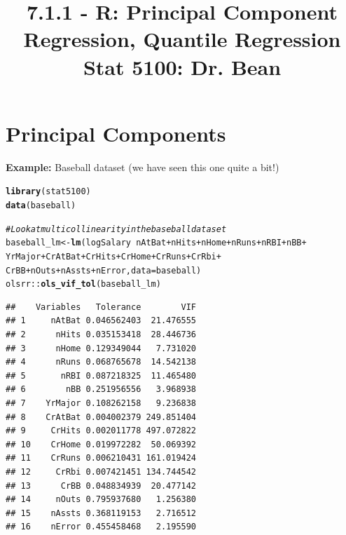 \documentclass{article}\usepackage[]{graphicx}\usepackage[]{color}
\makeatletter
\newcommand{\hlcom}[1]{\textcolor[rgb]{0.678,0.584,0.686}{\textit{#1}}}%
\newcommand{\hlopt}[1]{\textcolor[rgb]{0,0,0}{#1}}%
\newcommand{\hlstd}[1]{\textcolor[rgb]{0.345,0.345,0.345}{#1}}%
\newcommand{\hlkwb}[1]{\textcolor[rgb]{0.69,0.353,0.396}{#1}}%
\newcommand{\hlkwc}[1]{\textcolor[rgb]{0.333,0.667,0.333}{#1}}%
\newcommand{\hlkwd}[1]{\textcolor[rgb]{0.737,0.353,0.396}{\textbf{#1}}}%
\newenvironment{kframe}{%
 \def\at@end@of@kframe{}%
 \ifinner\ifhmode%
  \def\at@end@of@kframe{\end{minipage}}%
  \begin{minipage}{\columnwidth}%
 \fi\fi%
 \def\FrameCommand##1{\hskip\@totalleftmargin \hskip-\fboxsep
 \colorbox{shadecolor}{##1}\hskip-\fboxsep
     \hskip-\linewidth \hskip-\@totalleftmargin \hskip\columnwidth}%
 \MakeFramed {\advance\hsize-\width
   \@totalleftmargin\z@ \linewidth\hsize
   \@setminipage}}%
 {\par\unskip\endMakeFramed%
 \at@end@of@kframe}
\newenvironment{knitrout}{}{} %
\makeatother
\begin{document}
\title{%
  7.1.1 - R: Principal Component Regression, Quantile Regression \\
  \smallskip
  \large Stat 5100: Dr. Bean
}
\date{}

\maketitle

\section*{Principal Components}

\textbf{Example:} Baseball dataset (we have seen this one quite a bit!)

\begin{knitrout}
\color{fgcolor}\begin{kframe}
\begin{alltt}
\hlkwd{library}\hlstd{(stat5100)}
\hlkwd{data}\hlstd{(baseball)}

\hlcom{# Look at multicollinearity in the baseball dataset}
\hlstd{baseball_lm} \hlkwb{<-} \hlkwd{lm}\hlstd{(logSalary} \hlopt{~} \hlstd{nAtBat} \hlopt{+} \hlstd{nHits} \hlopt{+} \hlstd{nHome} \hlopt{+} \hlstd{nRuns} \hlopt{+} \hlstd{nRBI} \hlopt{+} \hlstd{nBB} \hlopt{+}
                    \hlstd{YrMajor} \hlopt{+} \hlstd{CrAtBat} \hlopt{+} \hlstd{CrHits} \hlopt{+} \hlstd{CrHome} \hlopt{+} \hlstd{CrRuns} \hlopt{+} \hlstd{CrRbi} \hlopt{+}
                    \hlstd{CrBB} \hlopt{+} \hlstd{nOuts} \hlopt{+} \hlstd{nAssts} \hlopt{+} \hlstd{nError,} \hlkwc{data} \hlstd{= baseball)}
\hlstd{olsrr}\hlopt{::}\hlkwd{ols_vif_tol}\hlstd{(baseball_lm)}
\end{alltt}
\begin{verbatim}
##    Variables   Tolerance        VIF
## 1     nAtBat 0.046562403  21.476555
## 2      nHits 0.035153418  28.446736
## 3      nHome 0.129349044   7.731020
## 4      nRuns 0.068765678  14.542138
## 5       nRBI 0.087218325  11.465480
## 6        nBB 0.251956556   3.968938
## 7    YrMajor 0.108262158   9.236838
## 8    CrAtBat 0.004002379 249.851404
## 9     CrHits 0.002011778 497.072822
## 10    CrHome 0.019972282  50.069392
## 11    CrRuns 0.006210431 161.019424
## 12     CrRbi 0.007421451 134.744542
## 13      CrBB 0.048834939  20.477142
## 14     nOuts 0.795937680   1.256380
## 15    nAssts 0.368119153   2.716512
## 16    nError 0.455458468   2.195590
\end{verbatim}
\end{kframe}
\end{knitrout}
\end{document}
